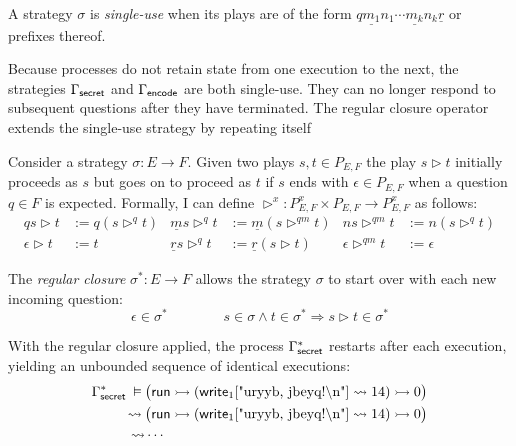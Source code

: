\begin{definition}
  A strategy $\sigma$ is \emph{single-use}
  when its plays are of the form
  $ q \underline{m_1} n_1 \cdots \underline{m_k} n_k \underline{r} $
  or prefixes thereof.
\end{definition}

Because processes do not retain state
from one execution to the next,
the strategies $\Gamma_{ \mathsf{secret} }$ and $\Gamma_{ \mathsf{encode} }$
are both single-use.
They can no longer respond to subsequent questions
after they have terminated.
The regular closure operator
extends the single-use strategy
by repeating itself

\begin{definition}
  Consider a strategy $\sigma : E \rightarrow F$.
  Given two plays $s, t \in P_{E,F}$
  the play $s \rhd t$ initially proceeds as $s$
  but goes on to proceed as $t$ if $s$ ends
  with $\epsilon \in P_{E,F}$
  when a question $q \in F$ is expected.
  Formally,
  I can define
  $\rhd^x : P_{E,F}^x \times P_{E,F} \rightarrow P_{E,F}^x$
  as follows:
  \begin{align*}
    qs \rhd t &:= q ( s \rhd^q t ) &
    \underline{m} s \rhd^q t &:= \underline{m} (s \rhd^{qm} t) &
    n s \rhd^{qm} t &:= n (s \rhd^q t) \\
    \epsilon \rhd t &:= t &
    \underline{r} s \rhd^q t &:= \underline{r} (s \rhd t) &
    \epsilon \rhd^{qm} t &:= \epsilon
  \end{align*}

  The \emph{regular closure} $\sigma^* : E \rightarrow F$
  allows the strategy $\sigma$
  to start over with each new incoming question:
  \[
    \epsilon \in \sigma^*
    \qquad \qquad
    s \in \sigma \wedge t \in \sigma^* \Rightarrow
    s \rhd t \in \sigma^*
  \]
\end{definition}

With the regular closure applied,
the process $\Gamma^*_{ \mathsf{secret} }$ restarts
after each execution,
yielding an unbounded sequence of identical executions:
\begin{align*}
  \Gamma^*_{ \mathsf{secret} }
  \:\vDash\:
  & \big( \mathsf{run} 
    \rightarrowtail ( \mathsf{write} _1[\texttt{\textnormal{"uryyb, jbeyq!\textbackslash{}n"}}] \leadsto 14)
  \rightarrowtail 0\big) \\
  \:\leadsto\:
  & \big( \mathsf{run} 
    \rightarrowtail ( \mathsf{write} _1[\texttt{\textnormal{"uryyb, jbeyq!\textbackslash{}n"}}] \leadsto 14)
  \rightarrowtail 0\big) \\
  \leadsto
  & \cdots
\end{align*}

